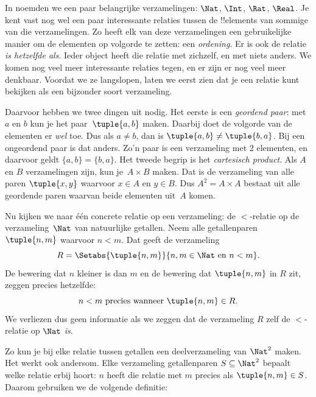 \documentclass[../../../include/open-logic-section]{subfiles}
\begin{document}

\begin{explain}
In  noemden we een paar belangrijke
verzamelingen: $\Nat$, $\Int$, $\Rat$, $\Real$. Je kent vast nog wel
een paar interessante relaties tussen de !!{element}s van sommige van
die verzamelingen. Zo heeft elk van deze verzamelingen een gebruikelijke
manier om de elementen op volgorde te zetten: een \emph{ordening}. Er
is ook de relatie \emph{is hetzelfde als}. Ieder
object heeft die relatie met zichzelf, en met niets anders. We komen
nog veel meer interessante relaties tegen, en er zijn er nog veel meer
denkbaar. Voordat we ze langslopen, laten we eerst zien dat je een
relatie kunt bekijken als een bijzonder soort verzameling.
  
Daarvoor hebben we twee dingen uit  nodig.
Het eerste is een \emph{geordend paar}: met $a$ en $b$ kun je
het paar~$\tuple{a, b}$ maken. Daarbij doet de volgorde van de elementen
er \emph{wel} toe. Dus als $a \neq b$, dan is $\tuple{a, b} \neq
\tuple{b, a}$. Bij een ongeordend paar is dat anders. Zo'n paar is een
verzameling met $2$ elementen, en daarvoor geldt $\{a, b\}=\{b, a\}$.
Het tweede begrip is het \emph{cartesisch product}. Als $A$ en $B$
verzamelingen zijn, kun je~$A \times B$ maken. Dat is de verzameling
van alle paren $\tuple{x, y}$ waarvoor $x \in A$ en $y \in B$. Dus
$A^{2}= A \times A$ bestaat uit alle geordende paren waarvan beide
elementen uit~$A$ komen.
  
Nu kijken we naar één concrete relatie op een verzameling: de
$<$-relatie op de verzameling~$\Nat$ van natuurlijke getallen. Neem
alle getallenparen $\tuple{n, m}$ waarvoor $n<m$. Dat geeft de
verzameling
\[
  R=\Setabs{\tuple{n, m}}{n, m \in \Nat \text{ en } n<m}.
\]
De bewering dat $n$ kleiner is dan $m$ en de bewering dat
$\tuple{n, m}$ in $R$ zit, zeggen precies hetzelfde:
\[
      n<m\text{ precies wanneer }\tuple{n, m} \in R.
\]
We verliezen dus geen informatie als we zeggen dat de verzameling $R$
zelf de $<$-relatie op $\Nat$ \emph{is}.

Zo kun je bij elke relatie tussen getallen een deelverzameling van
$\Nat^{2}$ maken. Het werkt ook andersom. Elke verzameling
getallenparen $S \subseteq \Nat^{2}$ bepaalt welke relatie erbij
hoort: $n$ heeft die relatie met $m$ precies als $\tuple{n, m} \in S$.
Daarom gebruiken we de volgende definitie:
\end{explain}
  
\end{document}
